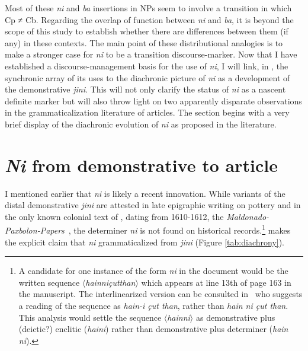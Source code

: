 \documentclass[output=paper
,modfonts
,nonflat]{langsci/langscibook}
\begin{document}
Most of these \textit{ni} and \textit{ba} insertions in NPs seem to involve a transition in which Cp ≠ Cb.
Regarding the overlap of function between \textit{ni} and \textit{ba}, it is beyond the scope of this study to establish whether there are differences between them (if any) in these contexts. 
The main point of these distributional analogies is to make a stronger case for \textit{ni} to be a transition discourse-marker.
Now that I have established a discourse-management basis for the use of \textit{ni}, I will link, in , the synchronic array of its uses to the diachronic picture of \textit{ni} as a development of the demonstrative \textit{jini}. This will not only clarify the status of \textit{ni} as a nascent definite marker but will also throw light on two apparently disparate observations in the grammaticalization literature of articles. The section begins with a very brief display of the diachronic evolution of \textit{ni} as proposed in the literature. 

\section{\textit{Ni} from demonstrative to article}\label{sec:pico:4}

I mentioned earlier that \textit{ni} is likely a recent innovation. While variants of the distal demonstrative \textit{jini} are attested in late epigraphic writing on pottery \citep[][114, 120--121]{Mora-Marin2009} and in the only known colonial text of , dating from 1610-1612, the \textit{Maldonado-Paxbolon-Papers}~\citep{Smailus1975}, the determiner \textit{ni} is not found on historical records.\footnote{A candidate for one instance of the form \textit{ni} in the document would be the written sequence $\langle$\textit{hainniçutthan}$\rangle$ which appears at line 13th of page 163 in the manuscript. The interlinearized version can be consulted in~\citet[][71, 158]{Smailus1975} who suggests a reading of the sequence as \textit{hain-i çut than}, rather than \textit{hain ni çut than}. This analysis would settle the sequence $\langle$\textit{hainni}$\rangle$ as demonstrative plus (deictic?) enclitic (\textit{haini}) rather than demonstrative plus determiner (\textit{hain ni}).} \citet[][120-121]{Mora-Marin2009} makes the explicit claim that \textit{ni} grammaticalized from \textit{jini} (Figure \ref{tab:diachrony}).
\end{document}
